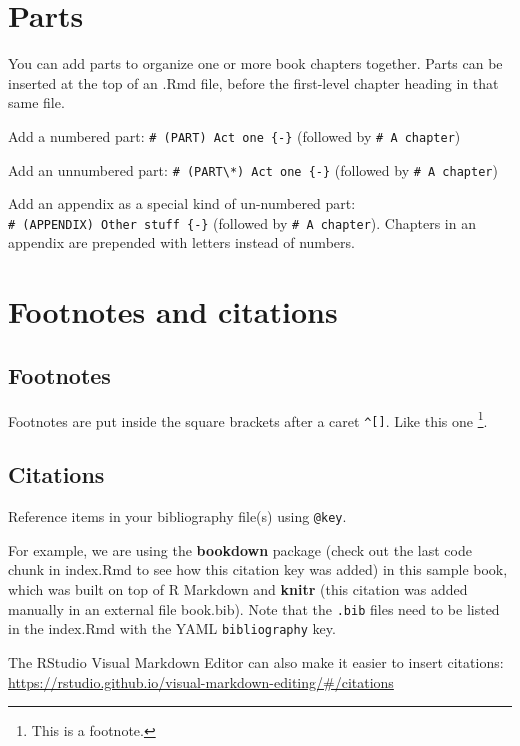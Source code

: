 \documentclass[
]{book}
\theoremstyle{definition}
\theoremstyle{definition}
\theoremstyle{definition}
\theoremstyle{definition}
\theoremstyle{remark}
\begin{document}
\chapter{Parts}\label{parts}

You can add parts to organize one or more book chapters together. Parts can be inserted at the top of an .Rmd file, before the first-level chapter heading in that same file.

Add a numbered part: \texttt{\#\ (PART)\ Act\ one\ \{-\}} (followed by \texttt{\#\ A\ chapter})

Add an unnumbered part: \texttt{\#\ (PART\textbackslash{}*)\ Act\ one\ \{-\}} (followed by \texttt{\#\ A\ chapter})

Add an appendix as a special kind of un-numbered part: \texttt{\#\ (APPENDIX)\ Other\ stuff\ \{-\}} (followed by \texttt{\#\ A\ chapter}). Chapters in an appendix are prepended with letters instead of numbers.

\chapter{Footnotes and citations}\label{footnotes-and-citations}

\section{Footnotes}\label{footnotes}

Footnotes are put inside the square brackets after a caret \texttt{\^{}{[}{]}}. Like this one \footnote{This is a footnote.}.

\section{Citations}\label{citations}

Reference items in your bibliography file(s) using \texttt{@key}.

For example, we are using the \textbf{bookdown} package \citep{R-bookdown} (check out the last code chunk in index.Rmd to see how this citation key was added) in this sample book, which was built on top of R Markdown and \textbf{knitr} \citep{xie2015} (this citation was added manually in an external file book.bib).
Note that the \texttt{.bib} files need to be listed in the index.Rmd with the YAML \texttt{bibliography} key.

The RStudio Visual Markdown Editor can also make it easier to insert citations: \url{https://rstudio.github.io/visual-markdown-editing/\#/citations}
\end{document}
